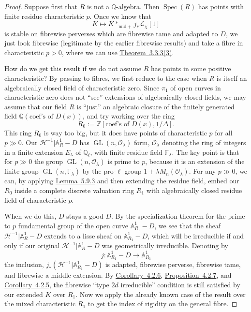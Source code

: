 \begin{proof}
Suppose first that \(R\) is not a \(\mathbb{Q}\)-algebra. Then
\(\operatorname{Spec}(R)\) has points with finite residue characteristic \(p\).
Once we know that
\[
  K\longmapsto K*_{\mathrm{mid}+}j_*\mathcal{L}_\chi[1]
\]
is stable on fibrewise perverses which are fibrewise tame and adapted to \(D\),
we just look fibrewise (legitimate by the earlier fibrewise results) and take a
fibre in characteristic \(p>0\), where we can use
\hyperref[thm:3.3.3]{Theorem~3.3.3(3)}.

How do we get this result if we do not assume \(R\) has points in some positive
characteristic? By passing to fibres, we first reduce to the case when \(R\) is
itself an algebraically closed field of characteristic zero. Since \(\pi_1\) of
open curves in characteristic zero does not ``see'' extensions of algebraically
closed fields, we may assume that our field \(R\) is ``just'' an algebraic
closure of the finitely generated field
\(\mathbb{Q}(\text{coef's of }D(x))\), and try working over the ring
\[
  R_0:=\mathbb{Z}[\text{coef's of }D(x),1/\Delta].
\]
This ring \(R_0\) is way too big, but it does have points of characteristic
\(p\) for all \(p\gg0\). Our
\(\mathcal{H}^{-1}\vert\mathbb{A}^1_R-D\) has
\(\operatorname{GL}(n,\mathcal{O}_\lambda)\) form, \(\mathcal{O}_\lambda\)
denoting the ring of integers in a finite extension \(E_\lambda\) of
\(\mathbb{Q}_\ell\), with finite residue field \(\mathbb{F}_\lambda\). The key
point is that for \(p\gg0\) the group
\(\operatorname{GL}(n,\mathcal{O}_\lambda)\) is prime to \(p\), because it is
an extension of the finite group
\(\operatorname{GL}(n,\mathbb{F}_\lambda)\) by the pro-\(\ell\) group
\(1+\lambda M_n(\mathcal{O}_\lambda)\). For any \(p\gg0\), we can, by applying
\hyperref[lem:5.9.3]{Lemma~5.9.3} and then extending the residue field, embed our
\(R_0\) inside a complete discrete valuation ring \(R_1\) with algebraically
closed residue field of characteristic \(p\).

When we do this, \(D\) stays a good \(D\). By the specialization theorem for
the prime to \(p\) fundamental group of the open curve \(\mathbb{A}^1_{R_1}-D\),
we see that the sheaf
\(\mathcal{H}^{-1}\vert\mathbb{A}^1_R-D\) extends to a lisse sheaf on
\(\mathbb{A}^1_{R_1}-D\), which will be irreducible if and only if our
original \(\mathcal{H}^{-1}\vert\mathbb{A}^1_R-D\) was geometrically
irreducible. Denoting by
\[
  j:\mathbb{A}^1_{R_1}-D\to\mathbb{A}^1_{R_1}
\]
the inclusion, \(j_*(\mathcal{H}^{-1}\vert\mathbb{A}^1_{R_1}-D)\) is adapted,
fibrewise perverse, fibrewise tame, and fibrewise a middle extension. By
\hyperref[cor:4.2.6]{Corollary~4.2.6}, \hyperref[prop:4.2.7]{Proposition~4.2.7},
and \hyperref[cor:4.2.5]{Corollary~4.2.5}, the fibrewise ``type \(2d\)
irreducible'' condition is still satisfied by our extended \(K\) over \(R_1\).
Now we apply the already known case of the result over the mixed characteristic
\(R_1\) to get the index of rigidity on the general fibre.
\end{proof}

